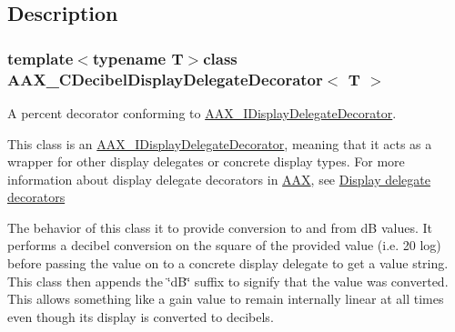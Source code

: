 \subsection{Description}
\subsubsection*{template$<$typename T$>$class A\+A\+X\+\_\+\+C\+Decibel\+Display\+Delegate\+Decorator$<$ T $>$}

A percent decorator conforming to \hyperlink{a00094}{A\+A\+X\+\_\+\+I\+Display\+Delegate\+Decorator}. 

This class is an \hyperlink{a00094}{A\+A\+X\+\_\+\+I\+Display\+Delegate\+Decorator}, meaning that it acts as a wrapper for other display delegates or concrete display types. For more information about display delegate decorators in \hyperlink{a00288}{A\+A\+X}, see \hyperlink{a00346_displaydelegates_decorators}{Display delegate decorators}

The behavior of this class it to provide conversion to and from d\+B values. It performs a decibel conversion on the square of the provided value (i.\+e. 20 log) before passing the value on to a concrete display delegate to get a value string. This class then appends the \char`\"{}d\+B\char`\"{} suffix to signify that the value was converted. This allows something like a gain value to remain internally linear at all times even though its display is converted to decibels.

